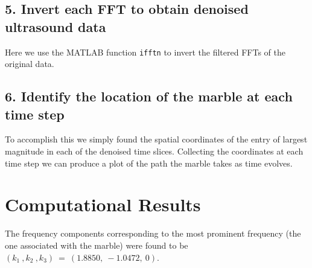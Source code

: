 \documentclass[fleqn,10pt]{SelfArx} %
\begin{document}
\subsection*{5. Invert each FFT to obtain denoised ultrasound data}
Here we use the MATLAB function \texttt{ifftn} to invert the filtered FFTs of the original data.

\subsection*{6. Identify the location of the marble at each time step}
To accomplish this we simply found the spatial coordinates of the entry of largest magnitude in each of the denoised time slices. Collecting the coordinates at each time step we can produce a plot of the path the marble takes as time evolves.



\section{Computational Results} %
\label{sec:computational_results}
The frequency components corresponding to the most prominent frequency (the one associated with the marble) were found to be $(k_1~,k_2~,k_3)~=~(1.8850,~ -1.0472,~ 0)$.



\end{document}
